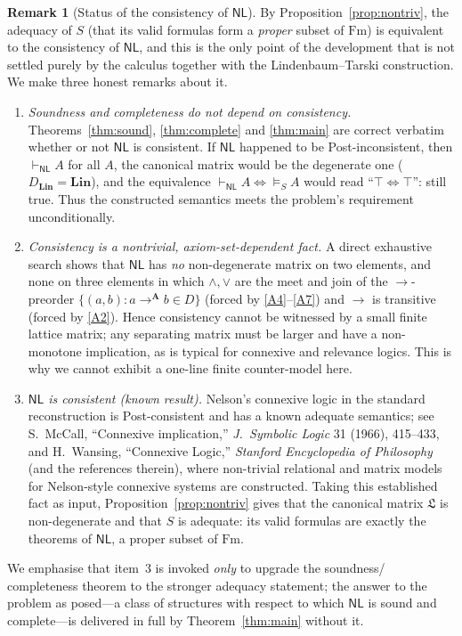 \documentclass[12pt]{article}
\theoremstyle{definition}
\newtheorem{remark}{Remark}
\newcommand{\NL}{\mathsf{NL}}
\newcommand{\prv}{\vdash_{\NL}}
\newcommand{\vld}{\vDash}
\newcommand{\Fm}{\mathrm{Fm}}
\newcommand{\imp}{\rightarrow}
\newcommand{\A}{\mathbf{A}}
\newcommand{\Lin}{\mathbf{Lin}}
\begin{document}
\begin{remark}[Status of the consistency of $\NL$]\label{rem:consistency-status}
By Proposition~\ref{prop:nontriv}, the adequacy of $S$ (that its valid formulas
form a \emph{proper} subset of $\Fm$) is equivalent to the consistency of $\NL$,
and this is the only point of the development that is not settled purely by the
calculus together with the Lindenbaum--Tarski construction. We make three honest
remarks about it.

\begin{enumerate}
\item \emph{Soundness and completeness do not depend on consistency.}
Theorems~\ref{thm:sound}, \ref{thm:complete} and \ref{thm:main} are correct
verbatim whether or not $\NL$ is consistent. If $\NL$ happened to be
Post-inconsistent, then $\prv A$ for all $A$, the canonical matrix would be the
degenerate one ($D_{\Lin}=\Lin$), and the equivalence $\prv A\iff\vld_S A$ would
read ``$\top\iff\top$'': still true. Thus the constructed semantics meets the
problem's requirement unconditionally.

\item \emph{Consistency is a nontrivial, axiom-set-dependent fact.} A direct
exhaustive search shows that $\NL$ has \emph{no} non-degenerate matrix on two
elements, and none on three elements in which $\wedge,\vee$ are the meet and join
of the $\imp$-preorder $\{(a,b):a\imp^{\A}b\in D\}$ (forced by
\eqref{A4}--\eqref{A7}) and $\imp$ is transitive (forced by \eqref{A2}). Hence
consistency cannot be witnessed by a small finite lattice matrix; any separating
matrix must be larger and have a non-monotone implication, as is typical for
connexive and relevance logics. This is why we cannot exhibit a one-line finite
counter-model here.

\item \emph{$\NL$ is consistent (known result).} Nelson's connexive logic in the
standard reconstruction is Post-consistent and has a known adequate semantics;
see S.~McCall, ``Connexive implication,'' \emph{J.\ Symbolic Logic} 31 (1966),
415--433, and H.~Wansing, ``Connexive Logic,'' \emph{Stanford Encyclopedia of
Philosophy} (and the references therein), where non-trivial relational and
matrix models for Nelson-style connexive systems are constructed. Taking this
established fact as input, Proposition~\ref{prop:nontriv} gives that the
canonical matrix $\mathfrak L$ is non-degenerate and that $S$ is adequate: its
valid formulas are exactly the theorems of $\NL$, a proper subset of $\Fm$.
\end{enumerate}

We emphasise that item~3 is invoked \emph{only} to upgrade the soundness/
completeness theorem to the stronger adequacy statement; the answer to the
problem as posed---a class of structures with respect to which $\NL$ is sound and
complete---is delivered in full by Theorem~\ref{thm:main} without it.
\end{remark}
\end{document}
